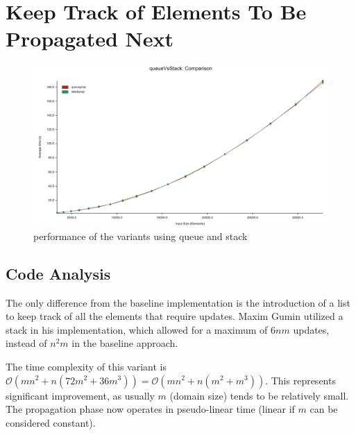 \documentclass[shortabstract, english, inz]{iithesis}
\begin{document}
\section{Keep Track of Elements To Be Propagated Next}
\label{stack}
\begin{figure}[H]
\centering
\includegraphics[width=1\textwidth, angle=0]{images/queue_vs_stack_performance.png}
\caption{performance of the variants using queue and stack}
\label{fig:queue_performance}
\end{figure}
\subsection{Code Analysis}
The only difference from the baseline implementation is the introduction of a list to keep track of all the elements that require updates. Maxim Gumin utilized a stack in his implementation, which allowed for a maximum of \(6nm\) updates, instead of \(n^2m\) in the baseline approach.

The time complexity of this variant is \(\mathcal{O}(mn^2 + n(72m^2 + 36m^3)) = \mathcal{O}(mn^2 + n(m^2 + m^3))\). This represents significant improvement, as usually \(m\) (domain size) tends to be relatively small. The propagation phase now operates in pseudo-linear time (linear if \(m\) can be considered constant).
\end{document}
